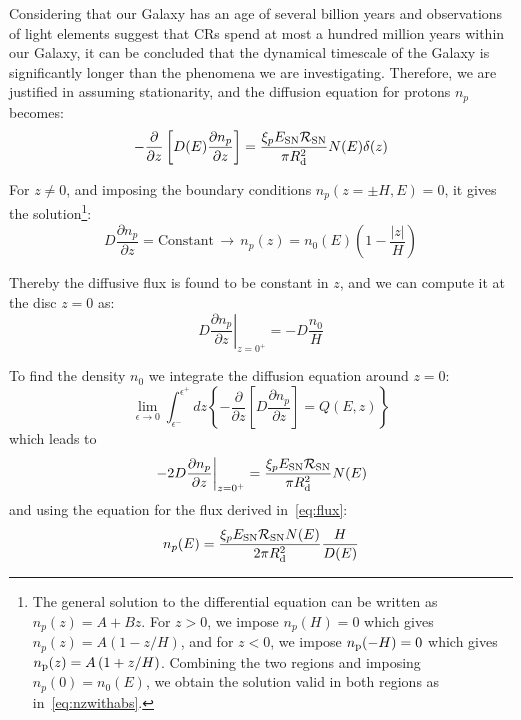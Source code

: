 Considering that our Galaxy has an age of several billion years and observations of light elements suggest that CRs spend at most a hundred million years within our Galaxy, it can be concluded that the dynamical timescale of the Galaxy is significantly longer than the phenomena we are investigating. Therefore, we are justified in assuming stationarity, and the diffusion equation for protons $n_p$ becomes:
%
\begin{equation}
-\frac{\partial}{\partial z}\left[ D(E) \frac{\partial n_p}{\partial z}\right] = \frac{\xi_p E_{\rm SN} \mathcal R_{\rm SN}}{\pi R_{\rm d}^2} N(E) \delta(z)
\label{eq:protons}
\end{equation}

For $z \ne 0$, and imposing the boundary conditions $n_p(z = \pm H, E) = 0$, it gives the solution\footnote{The general solution to the differential equation can be written as $n_p(z)=A+Bz$. For $z>0$, we impose $n_p(H)=0$ which gives $n_p(z)=A\left(1- z/H\right)$, and for $z<0$, we impose $n_{\rm p}(-H)=0$ which gives $n_{\rm p}(z)=A\left(1+ z/H\right)$. Combining the two regions and imposing $n_p(0)=n_0(E)$, we obtain the solution valid in both regions as in~\cref{eq:nzwithabs}.}:
%
\begin{equation}
D \frac{\partial n_p}{\partial z} = \text{Constant} \, \longrightarrow \, n_p(z) = n_0(E) \left( 1 - \frac{|z|}{H} \right)
\label{eq:nzwithabs}
\end{equation}

Thereby the diffusive flux is found to be constant in $z$, and we can compute it at the disc $z = 0$ as:
%
\begin{equation}
\left. D \frac{\partial n_p}{\partial z}\right|_{z=0^+} = - D \frac{n_{0}}{H}
\label{eq:flux}
\end{equation}

To find the density $n_0$ we integrate the diffusion equation around $z=0$:
%
\begin{equation}
\lim_{\epsilon\rightarrow0} \int_{\epsilon^-}^{\epsilon^+} \!\!\! dz 
\left\{ -\frac{\partial}{\partial z} \left[ D \frac{\partial n_p}{\partial z} \right] = Q(E,z) \right\} 
\end{equation}
%
which leads to
%
\begin{equation}
\left. -2D \frac{\partial n_p}{\partial z}\right|_{z=0^+} = \frac{\xi_p E_{\rm SN} \mathcal R_{\rm SN}}{\pi R_{\rm d}^2} N(E) 
\end{equation}
%
and using the equation for the flux derived in~\cref{eq:flux}:
%
\begin{equation}
n_p(E) = \frac{\xi_p E_{\rm SN} \mathcal R_{\rm SN} N(E)}{2 \pi R_{\rm d}^2}  \frac{H}{D(E)} 
\label{eq:protonsimplesolution}
\end{equation}

